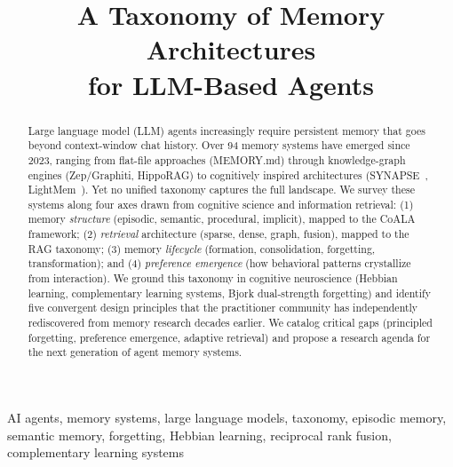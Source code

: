 \documentclass[conference]{IEEEtran}
\begin{document}
\title{A Taxonomy of Memory Architectures\\for LLM-Based Agents}

\author{
}

\maketitle
\pagestyle{plain}

\begin{abstract}
Large language model (LLM) agents increasingly require persistent memory
that goes beyond context-window chat history. Over 94 memory systems have
emerged since 2023, ranging from flat-file approaches (MEMORY.md) through
knowledge-graph engines (Zep/Graphiti, HippoRAG) to cognitively inspired
architectures (SYNAPSE~\cite{jiang2026synapse}, LightMem~\cite{fang2025lightmem}). Yet no unified taxonomy captures the full
landscape. We survey these systems along four axes drawn from cognitive
science and information retrieval: (1) memory \emph{structure} (episodic,
semantic, procedural, implicit), mapped to the CoALA framework; (2)
\emph{retrieval} architecture (sparse, dense, graph, fusion), mapped to
the RAG taxonomy; (3) memory \emph{lifecycle} (formation, consolidation,
forgetting, transformation); and (4) \emph{preference emergence} (how
behavioral patterns crystallize from interaction). We ground this taxonomy
in cognitive neuroscience (Hebbian learning, complementary learning
systems, Bjork dual-strength forgetting) and identify five convergent
design principles that the practitioner community has independently
rediscovered from memory research decades earlier. We catalog critical
gaps (principled forgetting, preference emergence, adaptive retrieval)
and propose a research agenda for the next generation of agent memory
systems.
\end{abstract}

\begin{IEEEkeywords}
AI agents, memory systems, large language models, taxonomy, episodic
memory, semantic memory, forgetting, Hebbian learning, reciprocal rank
fusion, complementary learning systems
\end{IEEEkeywords}












\def\UrlBreaks{\do\/\do-\do.\do=\do_\do?\do&\do\%\do\#\do\~}


\end{document}
